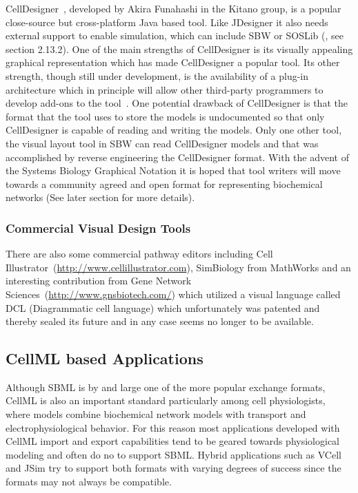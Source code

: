 \documentclass[12pt]{article}
\begin{document}
CellDesigner~\citep{Kitano:2005:Nat-Biotechnol}, developed by Akira
Funahashi in the Kitano group, is a popular close-source but
cross-platform Java based tool. Like JDesigner it also needs
external support to enable simulation, which can include SBW or
SOSLib (\citep{Machne:2006}, see section 2.13.2). One of the main
strengths of CellDesigner is its visually appealing graphical
representation which has made CellDesigner a popular tool. Its
other strength, though still under development, is the availability
of a plug-in architecture which in principle will allow other
third-party programmers to develop add-ons to the
tool~\citep{andreas:2008}. One potential drawback of CellDesigner is
that the format that the tool uses to store the models is
undocumented so that only CellDesigner is capable of reading and
writing the models. Only one other tool, the visual layout tool in
SBW can read CellDesigner models and that was accomplished by
reverse engineering the CellDesigner format. With the advent of the
Systems Biology Graphical Notation it is hoped that tool writers
will move towards a community agreed and open format for
representing biochemical networks (See later section for more
details).

\subsubsection{Commercial Visual Design Tools}

There are also some commercial pathway editors including Cell
Illustrator~(\url{http://www.cellillustrator.com}), SimBiology from
MathWorks and an interesting contribution from Gene Network
Sciences~(\url{http://www.gnsbiotech.com/}) which utilized a visual
language called DCL (Diagrammatic cell language) which unfortunately
was patented and thereby sealed its future and in any case seems no
longer to be available.

\subsection{CellML based Applications}

Although SBML is by and large one of the more popular exchange
formats, CellML is also an important standard particularly among
cell physiologists, where models combine biochemical network models
with transport and electrophysiological behavior. For this reason
most applications developed with CellML import and export
capabilities tend to be geared towards physiological modeling and
often do no to support SBML. Hybrid applications such as VCell and
JSim try to support both formats with varying degrees of success
since the formats may not always be compatible.
\end{document}
